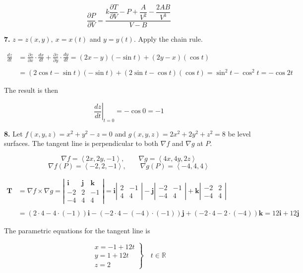 \documentclass{article}
\begin{document}
\[\boxed{\frac{\partial P}{\partial V}=\frac{k\dfrac{\partial T}{\partial V}-P+\dfrac A{V^2}-\dfrac{2AB}{V^3}}{V-B}}\]

\vspace{1em}

\textbf{7.} $z=z(x,y),\:x=x(t)$ and $y=y(t)$. Apply the chain rule.

\begin{align*}\frac{dz}{dt}&=\frac{\partial z}{\partial x}\cdot\frac{dx}{dt}+\frac{\partial z}{\partial y}\cdot\frac{dy}{dt}=(2x-y)(-\sin t)+(2y-x)(\cos t)\\\\&=(2\cos t-\sin t)(-\sin t)+(2\sin t-\cos t)(\cos t)=\sin^2t-\cos^2t=-\cos2t\end{align*}

The result is then

\[\left.\frac{dz}{dt}\right|_{t=0}=-\cos0=\boxed{-1}\]

\vspace{1em}

\textbf{8.} Let $f(x,y,z)=x^2+y^2-z=0$ and $g(x,y,z)=2x^2+2y^2+z^2=8$ be level surfaces. The tangent line is perpendicular to both $\nabla f$ and $\nabla g$ at $P$.

\[\nabla f=\left\langle2x,2y,-1\right\rangle,\qquad\nabla g=\left\langle4x,4y,2z\right\rangle\]
\[\nabla f(P)=\left\langle-2,2,-1\right\rangle,\qquad\nabla g(P)=\left\langle-4,4,4\right\rangle\]

\begin{align*}\mathbf{T}&=\nabla f\times\nabla g=\left|\begin{array}{ccc}
\mathbf{i}&\mathbf{j}&\mathbf{k}\\
-2&2&-1\\
-4&4&4
\end{array}\right|=\mathbf{i}\left|\begin{array}{cc}
2&-1\\4&4
\end{array}\right|-\mathbf{j}\left|\begin{array}{cc}
-2&-1\\-4&4
\end{array}\right|+\mathbf{k}\left|\begin{array}{cc}
-2&2\\-4&4
\end{array}\right|\\\\&=(2\cdot4-4\cdot(-1))\mathbf{i}-(-2\cdot4-(-4)\cdot(-1))\mathbf{j}+(-2\cdot4-2\cdot(-4))\mathbf{k}=12\mathbf i+12\mathbf j\end{align*}

The parametric equations for the tangent line is

\[\boxed{\left.\begin{array}{l}
x=-1+12t\\
y=1+12t\\
z=2
\end{array}\right\}\quad t\in\mathbb{R}}\]
\end{document}
